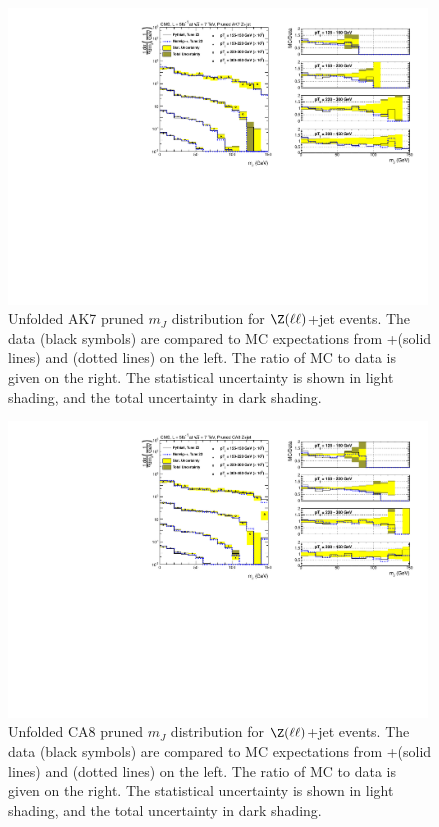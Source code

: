 \begin{figure}[!htb]
\includegraphics[width=0.99\textwidth]{figs/Zll/jetmassunf_ak7pr_log_Z.pdf}
\caption{Unfolded AK7 pruned $m_J$ distribution for $\Z(\ell\ell)$+jet events. The data (black symbols) are compared to MC expectations from {\MADGRAPH}+\PYTHIA (solid lines) and \HERWIG (dotted lines) on the left. The ratio of MC to data is given on the right.
The statistical uncertainty is shown in light shading, and the total uncertainty in dark shading.}
\label{figs:AK7ZmmInt2}
\end{figure}

\begin{figure}[!htb]
\centering
\includegraphics[width=0.99\textwidth]{figs/Zll/jetmassunf_ca8pr_log_Z.pdf}
\caption{Unfolded CA8 pruned $m_J$ distribution for $\Z(\ell\ell)$+jet events. The data (black symbols) are compared to MC expectations from {\MADGRAPH}+\PYTHIA (solid lines) and \HERWIG (dotted lines) on the left. The ratio of MC to data is given on the right.
The statistical uncertainty is shown in light shading, and the total uncertainty in dark shading.}
\label{figs:prunedZmmInt1}
\end{figure}

